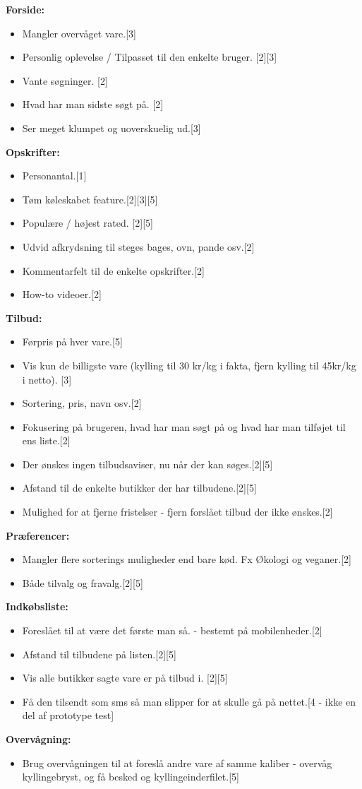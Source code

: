 		\textbf{Forside:}
	\begin{itemize}
		\item Mangler overvåget vare.{[}3{]}
		\item Personlig oplevelse / Tilpasset til den enkelte bruger. {[}2{]}{[}3{]}
		\item Vante søgninger. {[}2{]}
		\item Hvad har man sidste søgt på. {[}2{]}
		\item Ser meget klumpet og uoverskuelig ud.{[}3{]}
	\end{itemize}
		\textbf{Opskrifter:}
	\begin{itemize}
		\item Personantal.{[}1{]}
		\item Tøm køleskabet feature.{[}2{]}{[}3{]}{[}5{]}
		\item Populære / højest rated. {[}2{]}{[}5{]}
		\item Udvid afkrydsning til steges bages, ovn, pande osv.{[}2{]}
		\item Kommentarfelt til de enkelte opskrifter.{[}2{]}
		\item How-to videoer.{[}2{]}
	\end{itemize}
		\textbf{Tilbud:}
	\begin{itemize}
		\item Førpris på hver vare.{[}5{]}
		\item Vis kun de billigste vare (kylling til 30 kr/kg i fakta, fjern kylling til 45kr/kg i netto). {[}3{]}
		\item Sortering, pris, navn osv.{[}2{]}
		\item Fokusering på brugeren, hvad har man søgt på og hvad har man tilføjet til ens liste.{[}2{]}
		\item Der ønskes ingen tilbudsaviser, nu når der kan søges.{[}2{]}{[}5{]} 
		\item Afstand til de enkelte butikker der har tilbudene.{[}2{]}{[}5{]}
		\item Mulighed for at fjerne fristelser - fjern forslået tilbud der ikke ønskes.{[}2{]}
	\end{itemize}
		\textbf{Præferencer:}
	\begin{itemize}
		\item Mangler flere sorterings muligheder end bare kød. Fx Økologi og veganer.{[}2{]}
		\item Både tilvalg og fravalg.{[}2{]}{[}5{]}
	\end{itemize}
		\textbf{Indkøbsliste:}
	\begin{itemize}
		\item Foreslået til at være det første man så. - bestemt på mobilenheder.{[}2{]}
		\item Afstand til tilbudene på listen.{[}2{]}{[}5{]}
		\item Vis alle butikker sagte vare er på tilbud i. {[}2{]}{[}5{]}
		\item Få den tilsendt som sms så man slipper for at skulle gå på nettet.{[}4 - ikke en del af prototype test{]}
	\end{itemize}
		\textbf{Overvågning:}
	\begin{itemize}
		\item Brug overvågningen til at foreslå andre vare af samme kaliber - overvåg kyllingebryst, og få besked og kyllingeinderfilet.{[}5{]}
	\end{itemize}